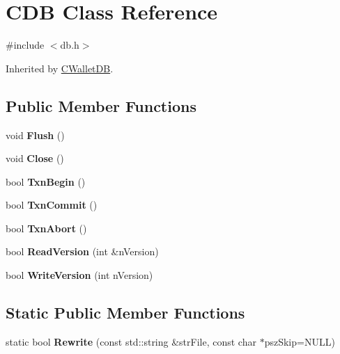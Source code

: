 \hypertarget{class_c_d_b}{}\section{C\+DB Class Reference}
\label{class_c_d_b}


{\ttfamily \#include $<$db.\+h$>$}



Inherited by \mbox{\hyperlink{class_c_wallet_d_b}{C\+Wallet\+DB}}.

\subsection*{Public Member Functions}
\begin{DoxyCompactItemize}
\item 
\mbox{\label{class_c_d_b_ab4a0447a8d19b4871b9fcc40edee9480}} 
void {\bfseries Flush} ()
\item 
\mbox{\label{class_c_d_b_af8bbf106662d67cdfdd6d58c429bc54b}} 
void {\bfseries Close} ()
\item 
\mbox{\label{class_c_d_b_a6f817da7947e1498e44034b7a1c8ac10}} 
bool {\bfseries Txn\+Begin} ()
\item 
\mbox{\label{class_c_d_b_a45061b3e71251dc74ddd868afb760590}} 
bool {\bfseries Txn\+Commit} ()
\item 
\mbox{\label{class_c_d_b_af9b0924f1ca98e0544e78e9bb58b4f03}} 
bool {\bfseries Txn\+Abort} ()
\item 
\mbox{\label{class_c_d_b_a16f591e27f41397570018c1fae084025}} 
bool {\bfseries Read\+Version} (int \&n\+Version)
\item 
\mbox{\label{class_c_d_b_aa3e63c0921af4c6fc92def1ba14500f1}} 
bool {\bfseries Write\+Version} (int n\+Version)
\end{DoxyCompactItemize}
\subsection*{Static Public Member Functions}
\begin{DoxyCompactItemize}
\item 
\mbox{\label{class_c_d_b_acfb8a373edb9c4cfab780fb7578b277e}} 
static bool {\bfseries Rewrite} (const std\+::string \&str\+File, const char $\ast$psz\+Skip=N\+U\+LL)
\end{DoxyCompactItemize}
